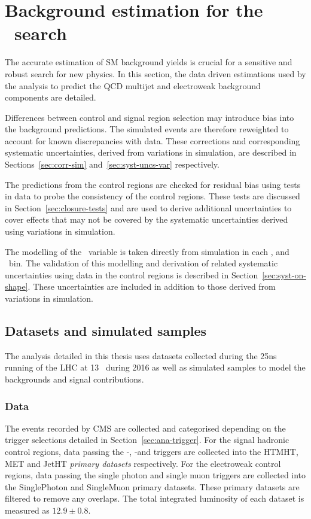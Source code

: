 \chapter{Background estimation for the \alphat~search}

The accurate estimation of SM background yields is crucial for a sensitive and robust
search for new physics. In this section, the data driven estimations used by
the \alphat analysis to predict the QCD multijet and electroweak 
background components are detailed. 

Differences between control and signal 
region selection may introduce bias into the background predictions. 
The simulated events are therefore reweighted to account for known discrepancies
with data. These corrections and corresponding systematic uncertainties, derived
from variations in simulation, are described in Sections~\ref{sec:corr-sim} 
and~\ref{sec:syst-uncs-var} respectively.  

The predictions from the control regions are checked for residual bias 
using tests in data to probe the consistency of the control regions. 
These tests are discussed in Section~\ref{sec:closure-tests} and 
are used to derive additional uncertainties to cover effects 
that may not be covered by the systematic uncertainties derived 
using variations in simulation.

The modelling of the \mht~variable is taken directly from simulation in each \nj, \nb
and \scalht~bin. The validation of this modelling 
and derivation of related systematic uncertainties using data in the 
control regions is described in Section~\ref{sec:syst-on-shape}. These uncertainties 
are included in addition to those derived from variations in simulation.

\section{Datasets and simulated samples}

The analysis detailed in this thesis uses datasets collected during the 25ns running of the 
LHC at 13 \TeV~during 2016 as well as simulated samples to model the backgrounds and
signal contributions.

\subsection{Data}
The events recorded by CMS are collected and categorised depending on the trigger selections
detailed in Section~\ref{sec:ana-trigger}. For the signal hadronic control regions, data passing the \alphat-\scalht,
\mht-\met and \scalht triggers are collected into the HTMHT, MET and JetHT \emph{primary datasets} respectively.
For the electroweak control regions, data passing the single photon and single muon triggers are collected 
into the SinglePhoton and SingleMuon primary datasets. These primary datasets are filtered to remove
any overlaps. The total integrated luminosity of each dataset is measured as $12.9\pm0.8$\ifb.

